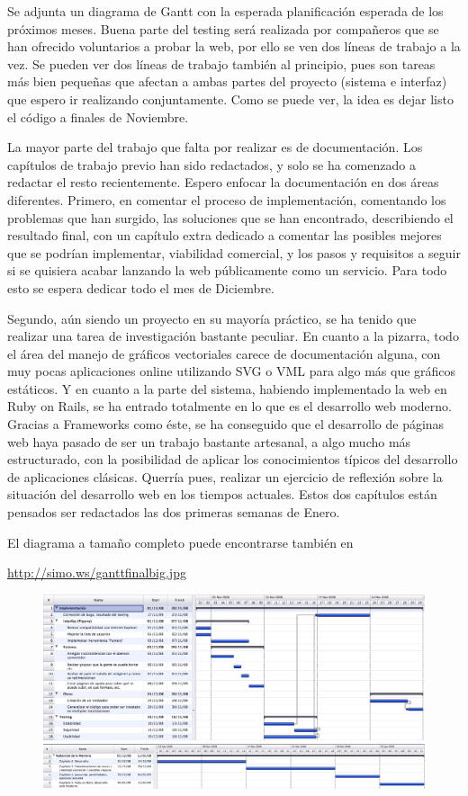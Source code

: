\documentclass [11pt]{article}
\begin{document}
Se adjunta un diagrama de Gantt con la esperada planificación esperada de los próximos meses. Buena parte del testing será realizada por compañeros que se han ofrecido voluntarios a probar la web, por ello se ven dos líneas de trabajo a la vez. Se pueden ver dos líneas de trabajo también al principio, pues son tareas más bien pequeñas que afectan a ambas partes del proyecto (sistema e interfaz) que espero ir realizando conjuntamente. Como se puede ver, la idea es dejar listo el código a finales de Noviembre.

La mayor parte del trabajo que falta por realizar es de documentación. Los capítulos de trabajo previo han sido redactados, y solo se ha comenzado a redactar el resto recientemente. Espero enfocar la documentación en dos áreas diferentes. Primero, en comentar el proceso de implementación, comentando los problemas que han surgido, las soluciones que se han encontrado, describiendo el resultado final, con un capítulo extra dedicado a comentar las posibles mejores que se podrían implementar, viabilidad comercial, y los pasos y requisitos a seguir si se quisiera acabar lanzando la web públicamente como un servicio. Para todo esto se espera dedicar todo el mes de Diciembre.

Segundo, aún siendo un proyecto en su mayoría práctico, se ha tenido que realizar una tarea de investigación bastante peculiar. En cuanto a la pizarra, todo el área del manejo de gráficos vectoriales carece de documentación alguna, con muy pocas aplicaciones online utilizando SVG o VML para algo más que gráficos estáticos. Y en cuanto a la parte del sistema, habiendo implementado la web en Ruby on Rails, se ha entrado totalmente en lo que es el desarrollo web moderno. Gracias a Frameworks como éste, se ha conseguido que el desarrollo de páginas web haya pasado de ser un trabajo bastante artesanal, a algo mucho más estructurado, con la posibilidad de aplicar los conocimientos típicos del desarrollo de aplicaciones clásicas. Querría pues, realizar un ejercicio de reflexión sobre la situación del desarrollo web en los tiempos actuales. Estos dos capítulos están pensados ser redactados las dos primeras semanas de Enero.

El diagrama a tamaño completo puede encontrarse también en

\url{http://simo.ws/ganttfinalbig.jpg}
\newpage

\begin{figure}[ht]
\centering
\includegraphics[angle=90,totalheight=1\textheight]{ganttfinal1.jpg}
\includegraphics[angle=90,totalheight=1\textheight]{ganttfinal2.jpg}
\end{figure}

\begin{figure}[ht]
\centering
\end{figure}
\end{document}
